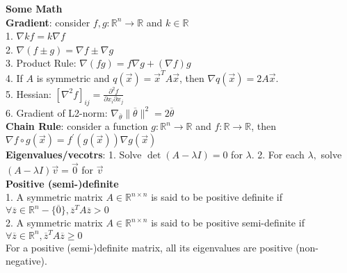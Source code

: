 \documentclass[10pt, letterpaper]{article}
\begin{document}
\begin{multicols*}{2}
\noindent \textbf{Some Math}\\
\textbf{Gradient}: consider $f, g : \mathbb{R}^{n} \rightarrow \mathbb{R}$ and $k \in \mathbb{R}$\\
1. $\nabla k f=k \nabla f$\\
2. $\nabla(f \pm g)=\nabla f \pm \nabla g$\\
3. Product Rule: $\nabla(f g)=f \nabla g+(\nabla f) g$\\
4. If $A$ is symmetric and $q(\vec{x})=\vec{x}^{T} A \vec{x}$, then $\nabla q(\vec{x})=2 A \vec{x}$.\\
5. Hessian: $\left[\nabla^{2} f\right]_{i j}=\frac{\partial^{2} f}{\partial x_{i} \partial x_{j}}$\\
6. Gradient of L2-norm: $\nabla_{\overline{\theta}}\|\overline{\theta}\|^{2}=2 \overline{\theta}$\\
\textbf{Chain Rule}: consider a function $g : \mathbb{R}^{n} \rightarrow \mathbb{R}$ and $f : \mathbb{R} \rightarrow \mathbb{R}$, then $\nabla f \circ g(\vec{x})=f^{\prime}(g(\vec{x})) \nabla g(\vec{x})$\\
\textbf{Eigenvalues/vecotrs}: 1. Solve $\operatorname{det}(A-\lambda I)=0$ for $\lambda$. 2. For each $\lambda,$ solve $(A-\lambda I) \vec{v}=\vec{0}$ for $\vec{v}$\\
\textbf{Positive (semi-)definite}\\
1. A symmetric matrix $A \in \mathbb{R}^{n \times n}$ is said to be positive definite if $\forall \overline{z} \in \mathbb{R}^{n}-\{\overline{0}\}, \overline{z}^{T} A \overline{z}>0$\\
2. A symmetric matrix $A \in \mathbb{R}^{n \times n}$ is said to be positive semi-definite if $\forall \overline{z} \in \mathbb{R}^{n}, \overline{z}^{T} A \overline{z} \geq 0$\\
For a positive (semi-)definite matrix, all its eigenvalues are positive (non-negative).






\end{multicols*}
\end{document}
